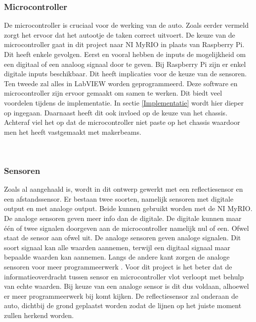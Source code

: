 \documentclass[a4paper,twoside,kulak]{kulakreport} %
\begin{document}
\subsubsection{Microcontroller}
De microcontroller is cruciaal voor de werking van de auto. Zoals eerder vermeld zorgt het ervoor dat het autootje de taken correct uitvoert. De keuze van de microcontroller gaat in dit project naar NI MyRIO in plaats van Raspberry Pi. Dit heeft enkele gevolgen. 
Eerst en vooral hebben de inputs de mogelijkheid om een digitaal of een analoog signaal door te geven. Bij Raspberry Pi zijn er enkel digitale inputs beschikbaar. Dit heeft implicaties voor de keuze van de sensoren. Ten tweede zal alles in LabVIEW worden geprogrammeerd. Deze software en microcontroller zijn ervoor gemaakt om samen te werken. Dit biedt veel voordelen tijdens de implementatie. In sectie \ref{Implementatie} wordt hier dieper op ingegaan. %
Daarnaast heeft dit ook invloed op de keuze van het chassis. Achteraf viel het op dat de microcontroller niet paste op het chassis waardoor men het heeft vastgemaakt met makerbeams.

\label{Microcontroller}
~
\subsubsection{Sensoren}
Zoals al aangehaald is, wordt in dit ontwerp gewerkt met een reflectiesensor en een afstandssensor. Er bestaan twee soorten, namelijk sensoren met digitale output en met analoge output. Beide kunnen gebruikt worden met de NI MyRIO. De analoge sensoren geven meer info dan de digitale. De digitale kunnen maar één of twee signalen doorgeven aan de microcontroller namelijk nul of een. Ofwel staat de sensor aan ofwel uit. De analoge sensoren geven analoge signalen. Dit soort signaal kan alle waarden aannemen, terwijl een digitaal signaal maar bepaalde waarden kan aannemen. Langs de andere kant zorgen de analoge sensoren voor meer programmeerwerk \cite{DigitaalOfAnaloog}. Voor dit project is het beter dat de informatieoverdracht tussen sensor en microcontroller vlot verloopt met behulp van echte waarden. Bij keuze van een analoge sensor is dit dus voldaan, alhoewel er meer programmeerwerk bij komt kijken. %
De reflectiesensor zal onderaan de auto, dichtbij de grond geplaatst worden zodat de lijnen op het juiste moment zullen herkend worden.

~
\end{document}
